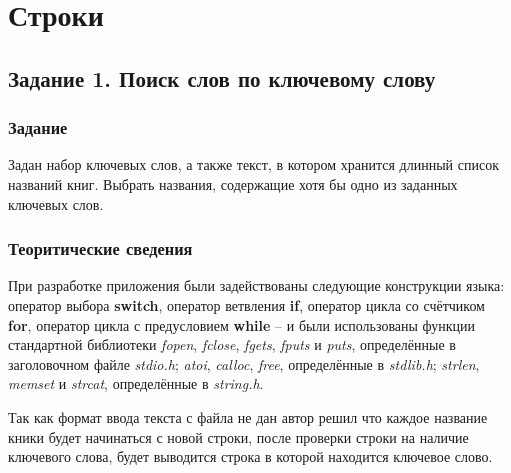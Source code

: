 \documentclass[12pt,a4paper]{report}
\begin{document}
\chapter{Строки}
\section{Задание 1. Поиск слов по ключевому слову}
\subsection{Задание}
\hspace{\parindent}
Задан набор ключевых слов, а также текст, в котором хранится длинный список названий
книг. Выбрать названия, содержащие хотя бы одно из заданных ключевых слов.
\subsection{Теоритические сведения}
\hspace{\parindent}
При разработке приложения были задействованы следующие конструкции языка: оператор выбора \textbf{switch}, оператор ветвления \textbf{if}, оператор цикла со счётчиком \textbf{for}, оператор цикла с предусловием \textbf{while} -- и были использованы функции стандартной библиотеки \textit{fopen}, \textit{fclose}, \textit{fgets}, \textit{fputs} и \textit{puts}, определённые в заголовочном файле \textit{stdio.h}; \textit{atoi}, \textit{calloc}, \textit{free}, определённые в \textit{stdlib.h}; \textit{strlen}, \textit{memset} и \textit{strcat}, определённые в \textit{string.h}.

\hspace{\parindent}
Так как формат ввода текста с файла не дан автор решил что каждое название кники будет начинаться с новой строки, после проверки строки на наличие ключевого слова, будет выводится строка в которой находится ключевое слово.
\end{document}

